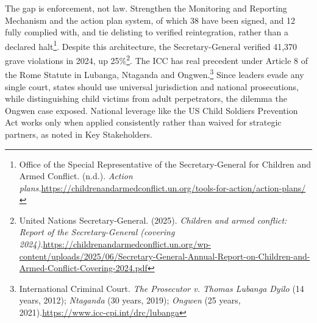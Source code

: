 The gap is enforcement, not law. Strengthen the Monitoring and Reporting Mechanism and the action plan system, of which 38 have been signed, and 12 fully complied with, and tie delisting to verified reintegration, rather than a declared halt\footnote{Office of the Special Representative of the Secretary-General for Children and Armed Conflict. (n.d.). \emph{Action plans.}\url{https://childrenandarmedconflict.un.org/tools-for-action/action-plans/}}. Despite this architecture, the Secretary-General verified 41,370 grave violations in 2024, up 25\%\footnote{United Nations Secretary-General. (2025). \emph{Children and armed conflict: Report of the Secretary-General (covering 2024).}\url{https://childrenandarmedconflict.un.org/wp-content/uploads/2025/06/Secretary-General-Annual-Report-on-Children-and-Armed-Conflict-Covering-2024.pdf}}. The ICC has real precedent under Article 8 of the Rome Statute in Lubanga, Ntaganda and Ongwen.\footnote{International Criminal Court. \emph{The Prosecutor v. Thomas Lubanga Dyilo} (14 years, 2012); \emph{Ntaganda} (30 years, 2019); \emph{Ongwen} (25 years, 2021).\url{https://www.icc-cpi.int/drc/lubanga}} Since leaders evade any single court, states should use universal jurisdiction and national prosecutions, while distinguishing child victims from adult perpetrators, the dilemma the Ongwen case exposed. National leverage like the US Child Soldiers Prevention Act works only when applied consistently rather than waived for strategic partners, as noted in Key Stakeholders.
